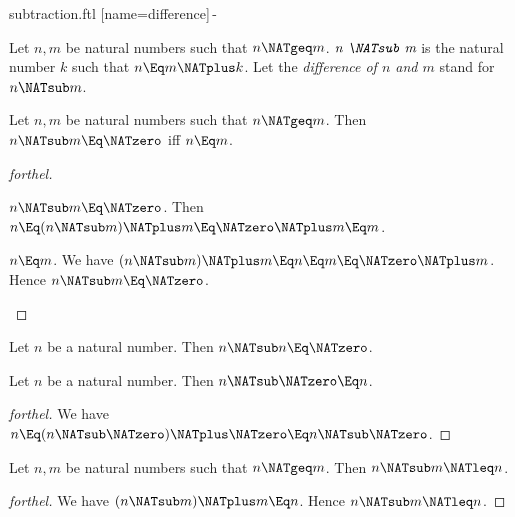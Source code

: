 \documentclass{stex}
\begin{document}
\begin{smodule}{subtraction.ftl}
[name=difference]{\,-\,}

\begin{definition}[forthel,for=difference]
  Let $n, m$ be natural numbers such that $n \NATgeq m$.
  $\emph{n \NATsub m}$ is the natural number $k$ such that $n \Eq m \NATplus k$.
  Let the \emph{difference of $n$ and $m$} stand for $n \NATsub m$.
\end{definition}

\begin{proposition}[forthel]
  Let $n, m$ be natural numbers such that $n \NATgeq m$.
  Then $n \NATsub m \Eq \NATzero$ iff $n \Eq m$.
\end{proposition}
\begin{proof}[forthel]
  \begin{case}{$n \NATsub m \Eq \NATzero$.}
    Then $n
      \Eq (n \NATsub m) \NATplus m
      \Eq \NATzero \NATplus m
      \Eq m$.
  \end{case}

  \begin{case}{$n \Eq m$.}
    We have $(n \NATsub m) \NATplus m
      \Eq n
      \Eq m
      \Eq \NATzero \NATplus m$.
    Hence $n \NATsub m \Eq \NATzero$.
  \end{case}
\end{proof}

\begin{corollary}[forthel]
  Let $n$ be a natural number.
  Then $n \NATsub n \Eq \NATzero$.
\end{corollary}

\begin{proposition}[forthel]
  Let $n$ be a natural number.
  Then $n \NATsub \NATzero \Eq n$.
\end{proposition}
\begin{proof}[forthel]
  We have $n
    \Eq (n \NATsub \NATzero) \NATplus \NATzero
    \Eq n \NATsub \NATzero$.
\end{proof}

\begin{proposition}[forthel]
  Let $n, m$ be natural numbers such that $n \NATgeq m$.
  Then $n \NATsub m \NATleq n$.
\end{proposition}
\begin{proof}[forthel]
  We have $(n \NATsub m) \NATplus m \Eq n$.
  Hence $n \NATsub m \NATleq n$.
\end{proof}


\end{smodule}
\end{document}
